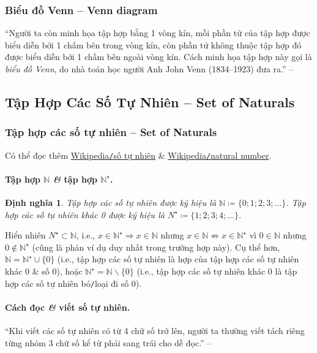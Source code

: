 \documentclass{article}
\numberwithin{equation}{section}
\newtheorem{dinhnghia}{Định nghĩa}[section]
\begin{document}
\subsubsection{Biểu đồ Venn -- Venn diagram}
``Người ta còn minh họa tập hợp bằng 1 vòng kín, mỗi phần tử của tập hợp được biểu diễn bởi 1 chấm bên trong vòng kín, còn phần tử không thuộc tập hợp đó được biểu diễn bởi 1 chấm bên ngoài vòng kín. Cách minh họa tập hợp này gọi là \textit{biểu đồ Venn}, do nhà toán học người Anh John Venn (1834--1923) đưa ra.'' -- \cite[p. 8]{SGK_Toan_6_Canh_Dieu_tap_1}


\subsection{Tập Hợp Các Số Tự Nhiên -- Set of Naturals}

\subsubsection{Tập hợp các số tự nhiên -- Set of Naturals}
Có thể đọc thêm \href{https://vi.wikipedia.org/wiki/S%E1%BB%91_t%E1%BB%B1_nhi%C3%AAn}{Wikipedia\texttt{/}số tự nhiên} \& \href{https://en.wikipedia.org/wiki/Natural_number}{Wikipedia\texttt{/}natural number}.

\paragraph{Tập hợp $\mathbb{N}$ \textit{\&} tập hợp $\mathbb{N}^\star$.}
\begin{dinhnghia}
	\emph{Tập hợp các số tự nhiên} được ký hiệu là $\mathbb{N}\coloneqq\{0;1;2;3;\ldots\}$. \emph{Tập hợp các số tự nhiên khác 0} được ký hiệu là $N^\star\coloneqq\{1;2;3;4;\ldots\}$.
\end{dinhnghia}
Hiển nhiên $N^\star\subset\mathbb{N}$, i.e., $x\in\mathbb{N}^\star\Rightarrow x\in\mathbb{N}$ nhưng $x\in\mathbb{N}\not\Rightarrow x\in\mathbb{N}^\star$ vì $0\in\mathbb{N}$ nhưng $0\notin\mathbb{N}^\star$ (cũng là phản ví dụ duy nhất trong trường hợp này). Cụ thể hơn, $\mathbb{N} = \mathbb{N}^\star\cup\{0\}$ (i.e., tập hợp các số tự nhiên là hợp của tập hợp các số tự nhiên khác 0 \& số 0), hoặc $\mathbb{N}^\star = \mathbb{N}\backslash\{0\}$ (i.e., tập hợp các số tự nhiên khác 0 là tập hợp các số tự nhiên bỏ\texttt{/}loại đi số 0).

\paragraph{Cách đọc \textit{\&} viết số tự nhiên.} ``Khi viết các số tự nhiên có từ 4 chữ số trở lên, người ta thường viết tách riêng từng nhóm 3 chữ số kể từ phải sang trái cho dễ đọc.'' -- \cite[p. 9]{SGK_Toan_6_Canh_Dieu_tap_1}
\end{document}
